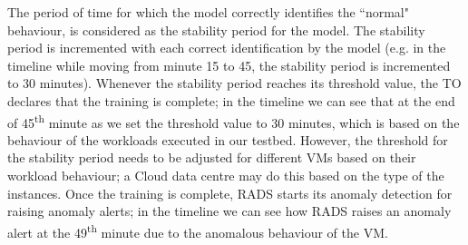 The period of time for which the model correctly identifies the ``normal" behaviour, is considered as the stability period for the model. The stability period is incremented with each correct identification by the model (e.g. in the timeline while moving from minute 15 to 45, the stability period is incremented to 30 minutes). Whenever the stability period reaches its threshold value, the TO declares that the training is complete; in the timeline we can see that at the end of 45\textsuperscript{th} minute as we set the threshold value to 30 minutes, which is based on the behaviour of the workloads executed in our testbed. 
However, the threshold for the stability period needs to be adjusted for different VMs based on their workload behaviour; a Cloud data centre may do this based on the type of the instances. 
Once the training is complete, RADS starts its anomaly detection for raising anomaly alerts; in the timeline we can see how RADS raises an anomaly alert at the 49\textsuperscript{th} minute due to the anomalous behaviour of the VM.




